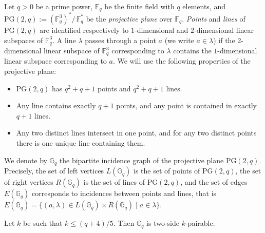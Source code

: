 \documentclass[a4paper,UKenglish,cleveref, autoref, thm-restate]{arxiv}
\newcommand{\ls}{\leqslant}
\newcommand{\G}[1][q]{\mathbb{G}_{#1}}
\begin{document}
Let $q > 0$ be a prime power, $\mathbb{F}_q$ be the finite field with $q$ elements, and $\mbox{PG}(2,q) := \left(\mathbb{F}_q^3\right)^{*}\!/\, \mathbb{F}_q^{*}$ be the \emph{projective plane} over $\mathbb{F}_q$. \emph{Points} and \emph{lines} of $\mbox{PG}(2,q)$ are identified respectively to $1$-dimensional and $2$-dimensional linear subspaces of $\mathbb{F}_q^3$. A line $\lambda$ passes through a point $a$ (we write $a\in \lambda$) if the 2-dimensional linear subspace of $\mathbb{F}_q^3$ corresponding to $\lambda$ contains the $1$-dimensional linear subspace corresponding to $a$. We will use the following properties of the projective plane:
\begin{itemize}
    \item $\mbox{PG}(2,q)$ has $q^2+q+1$ points and $q^2+q+1$  lines.
    \item Any line contains exactly $q+1$ points, and any point is contained in exactly $q+1$ lines.
    \item Any two distinct lines intersect in  one point, and for any two distinct points there is one unique line containing them.
\end{itemize}

 We denote by $\G$ the bipartite incidence graph of the projective plane $\mbox{PG}(2,q)$.
 Precisely, the set of left vertices  $L(\G)$ is the set of points of $\mbox{PG}(2,q)$, the set of right vertices $R(\G)$ is the set of lines of $\mbox{PG}(2,q)$, and the set of edges $E(\G)$ corresponds to incidences between points and lines, that is $E(\G) = \{(a,\lambda) \in L(\G)\times R(\G) \mid a \in \lambda\}$.

\begin{theorem} \label{theo:bipartite-kpair}
    Let $k$ be such that $k \ls (q+4)/5$. Then $\G$ is two-side $k$-pairable.
\end{theorem}
\end{document}
